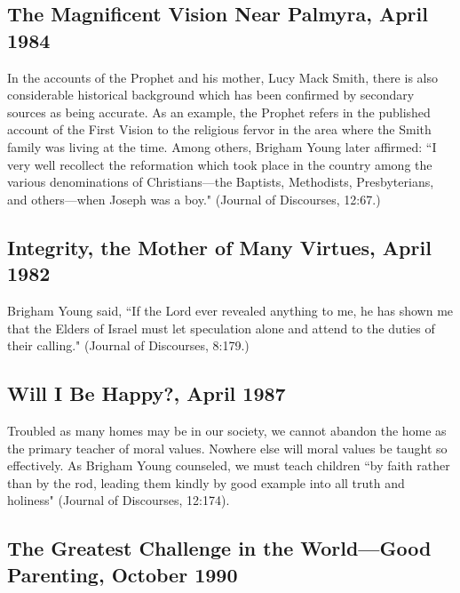 \subsection{The Magnificent Vision Near Palmyra, April 1984}

In the accounts of the Prophet and his mother, Lucy Mack Smith, there is also considerable historical background which has been confirmed by secondary sources as being accurate. As an example, the Prophet refers in the published account of the First Vision to the religious fervor in the area where the Smith family was living at the time. Among others, Brigham Young later affirmed: ``I very well recollect the reformation which took place in the country among the various denominations of Christians—the Baptists, Methodists, Presbyterians, and others—when Joseph was a boy." (Journal of Discourses, 12:67.)

\subsection{Integrity, the Mother of Many Virtues, April 1982}

Brigham Young said, ``If the Lord ever revealed anything to me, he has shown me that the Elders of Israel must let speculation alone and attend to the duties of their calling." (Journal of Discourses, 8:179.)

\subsection{Will I Be Happy?, April 1987}

Troubled as many homes may be in our society, we cannot abandon the home as the primary teacher of moral values. Nowhere else will moral values be taught so effectively. As Brigham Young counseled, we must teach children ``by faith rather than by the rod, leading them kindly by good example into all truth and holiness" (Journal of Discourses, 12:174).

\subsection{The Greatest Challenge in the World—Good Parenting, October 1990}


